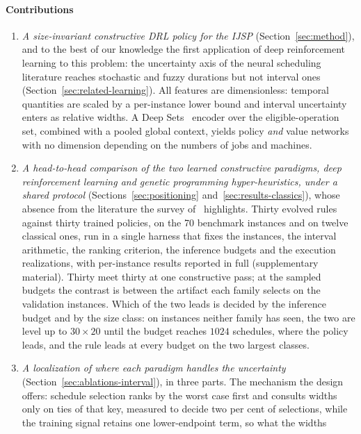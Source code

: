 \documentclass[preprint,12pt]{elsarticle}
\theoremstyle{definition}
\theoremstyle{remark}
\begin{document}
\paragraph{Contributions}
\begin{enumerate}
\item \emph{A size-invariant constructive DRL policy for the
  IJSP} (Section~\ref{sec:method}), and to the best of our knowledge
  the first application of deep reinforcement learning to this
  problem: the uncertainty axis of the neural scheduling literature
  reaches stochastic and fuzzy durations but not interval ones
  (Section~\ref{sec:related-learning}). All features are dimensionless:
  temporal quantities are scaled by a per-instance lower bound and
  interval uncertainty enters as relative widths. A Deep
  Sets~\citep{Zaheer2017} encoder over the eligible-operation set,
  combined with a pooled global context, yields policy \emph{and}
  value networks with no dimension depending on the numbers of jobs
  and machines.
\item \emph{A head-to-head comparison of the two learned constructive
  paradigms, deep reinforcement learning and genetic programming
  hyper-heuristics, under a shared protocol}
  (Sections~\ref{sec:positioning} and~\ref{sec:results-classics}),
  whose absence from the literature the survey of~\citet{Xu2025}
  highlights. Thirty evolved rules against thirty trained policies,
  on the 70 benchmark instances and on twelve classical ones, run in
  a single harness that fixes the instances, the interval arithmetic,
  the ranking criterion, the inference budgets and the execution
  realizations, with per-instance results reported in full
  (supplementary material). Thirty meet thirty at one constructive
  pass; at the sampled budgets the contrast is between the artifact
  each family selects on the validation instances. Which of the two
  leads is decided by the inference budget and by the size class: on
  instances neither family has seen, the two are level up to
  $30{\times}20$ until the budget reaches $1024$ schedules, where the
  policy leads, and the rule leads at every budget on the two
  largest classes.
\item \emph{A localization of where each paradigm handles the
  uncertainty} (Section~\ref{sec:ablations-interval}), in three
  parts. The mechanism the design offers: schedule selection ranks
  by the worst case first and consults widths only on ties of that
  key, measured to decide two per cent of selections, while the
  training signal retains one lower-endpoint term, so what the widths

\end{enumerate}
\end{document}
